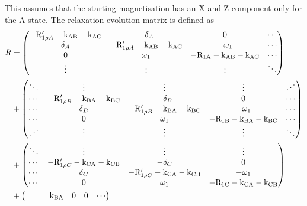 This assumes that the starting magnetisation has an X and Z component only for the A state.
The relaxation evolution matrix is defined as
\begin{align}
    R &= \begin{pmatrix}
           -\mathrm{R}_{1\rho A}'-\textrm{k}_\textrm{AB}-\textrm{k}_\textrm{AC} & -\delta_A                 & 0                 & \cdots \\
           \delta_A                  & -\mathrm{R}_{1\rho A}'-\textrm{k}_\textrm{AB}-\textrm{k}_\textrm{AC} & -\omega_1        & \cdots \\
           0                         & \omega_1                 & -\mathrm{R}_\textrm{1A}-\textrm{k}_\textrm{AB}-\textrm{k}_\textrm{AC} & \cdots \\
           \vdots                    & \vdots                    & \vdots            & \ddots \\
         \end{pmatrix} \nonumber \\
      &+ \begin{pmatrix}
           \ddots  & \vdots                    & \vdots                    & \vdots            & \iddots \\
           \cdots  & -\mathrm{R}_{1\rho B}'-\textrm{k}_\textrm{BA}-\textrm{k}_\textrm{BC} & -\delta_B                 & 0                 & \cdots \\
           \cdots  & \delta_B                  & -\mathrm{R}_{1\rho B}'-\textrm{k}_\textrm{BA}-\textrm{k}_\textrm{BC} & -\omega_1        & \cdots \\
           \cdots  & 0                         & \omega_1                 & -\mathrm{R}_\textrm{1B}-\textrm{k}_\textrm{BA}-\textrm{k}_\textrm{BC} & \cdots \\
           \iddots & \vdots                    & \vdots                    & \vdots            & \ddots \\
         \end{pmatrix} \nonumber \\
      &+ \begin{pmatrix}
           \ddots & \vdots                    & \vdots                    & \vdots \\
           \cdots & -\mathrm{R}_{1\rho C}'-\textrm{k}_\textrm{CA}-\textrm{k}_\textrm{CB} & -\delta_C                 & 0 \\
           \cdots & \delta_C                  & -\mathrm{R}_{1\rho C}'-\textrm{k}_\textrm{CA}-\textrm{k}_\textrm{CB} & -\omega_1 \\
           \cdots & 0                         & \omega_1                 & -\mathrm{R}_\textrm{1C}-\textrm{k}_\textrm{CA}-\textrm{k}_\textrm{CB} \\
         \end{pmatrix} \nonumber \\
      &+ \begin{pmatrix}
                   &         &         & \textrm{k}_\textrm{BA}    & 0       & 0       & \cdots \\

\end{pmatrix}
\end{align}
